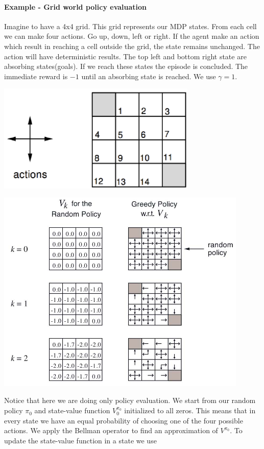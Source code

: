 \documentclass[main.tex]{subfiles}
\begin{document}
\paragraph{Example - Grid world policy evaluation} Imagine to have a 4x4 grid. This grid represents our MDP states. From each cell we can make four actions. Go up, down, left or right. If the agent make an action which result in reaching a cell outside the grid, the state remains unchanged. The action will have deterministic results. The top left and bottom right state are absorbing states(goals). If we reach these states the episode is concluded. The immediate reward is $-1$ until an absorbing state is reached. We use $\gamma = 1$.
\begin{center}
    \includegraphics[width=95mm]{img/Grid_World.PNG}
\end{center}
\begin{center}
    \includegraphics[width=120mm]{img/First-Grid_World.jpg}
\end{center}
Notice that here we are doing only policy evaluation.
We start from our random policy $\pi_0$ and state-value function $V^{\pi_0}_0$ initialized to all zeros. This means that in every state we have an equal probability of choosing one of the four possible actions. We apply the Bellman operator to find an approximation of $V^{\pi_0}$. To update the state-value function in a state we use
\end{document}
